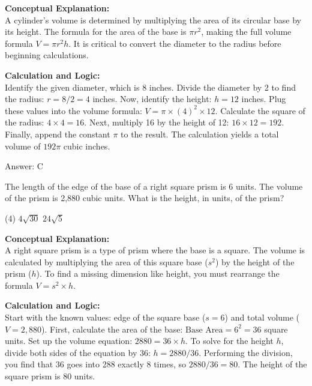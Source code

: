 \documentclass[11pt,paper=a4,answers]{exam}
\begin{document}
\begin{questions}
\begin{solution}
\textbf{Conceptual Explanation:} \\
A cylinder's volume is determined by multiplying the area of its circular base by its height. The formula for the area of the base is $\pi r^2$, making the full volume formula $V = \pi r^2 h$. It is critical to convert the diameter to the radius before beginning calculations.

\vspace{30pt}

\textbf{Calculation and Logic:} \\
Identify the given diameter, which is 8 inches. Divide the diameter by 2 to find the radius: $r = 8 / 2 = 4$ inches. Now, identify the height: $h = 12$ inches. Plug these values into the volume formula: $V = \pi \times (4)^2 \times 12$. Calculate the square of the radius: $4 \times 4 = 16$. Next, multiply 16 by the height of 12: $16 \times 12 = 192$. Finally, append the constant $\pi$ to the result. The calculation yields a total volume of $192\pi$ cubic inches.

\vspace{30pt}

Answer: \colorbox{yellow!100}{C}
\end{solution}

\vspace{60pt}

\question
The length of the edge of the base of a right square prism is 6 units. The volume of the prism is 2,880 cubic units. What is the height, in units, of the prism?
\begin{tasks}(4)
    \task $4\sqrt{30}$
    \task $24\sqrt{5}$
\end{tasks}

\begin{solution}
\textbf{Conceptual Explanation:} \\
A right square prism is a type of prism where the base is a square. The volume is calculated by multiplying the area of this square base ($s^2$) by the height of the prism ($h$). To find a missing dimension like height, you must rearrange the formula $V = s^2 \times h$.

\vspace{30pt}

\textbf{Calculation and Logic:} \\
Start with the known values: edge of the square base ($s = 6$) and total volume ($V = 2,880$). First, calculate the area of the base: $\text{Base Area} = 6^2 = 36$ square units. Set up the volume equation: $2880 = 36 \times h$. To solve for the height $h$, divide both sides of the equation by 36: $h = 2880 / 36$. Performing the division, you find that 36 goes into 288 exactly 8 times, so $2880 / 36 = 80$. The height of the square prism is 80 units.


\end{solution}
\end{questions}
\end{document}
